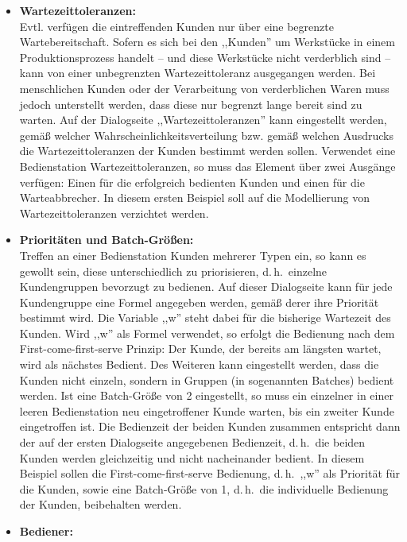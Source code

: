 \documentclass[deutsch]{svmono}
\begin{document}
\begin{itemize}
\item
\textbf{Wartezeittoleranzen:}\\
Evtl. verfügen die eintreffenden Kunden nur über eine begrenzte Wartebereitschaft. Sofern es sich bei den ,,Kunden'' um Werkstücke in einem Produktionsprozess handelt – und diese Werkstücke nicht verderblich sind – kann von einer unbegrenzten Wartezeittoleranz ausgegangen werden. Bei menschlichen Kunden oder der Verarbeitung von verderblichen Waren muss jedoch unterstellt werden, dass diese nur begrenzt lange bereit sind zu warten. Auf der Dialogseite ,,Wartezeittoleranzen'' kann eingestellt werden, gemäß welcher Wahrscheinlichkeitsverteilung bzw. gemäß welchen Ausdrucks die Wartezeittoleranzen der Kunden bestimmt werden sollen. Verwendet eine Bedienstation Wartezeittoleranzen, so muss das Element über zwei Ausgänge verfügen: Einen für die erfolgreich bedienten Kunden und einen für die Warteabbrecher. In diesem ersten Beispiel soll auf die Modellierung von Wartezeittoleranzen verzichtet werden.
\item
\textbf{Prioritäten und Batch-Größen:}\\
Treffen an einer Bedienstation Kunden mehrerer Typen ein, so kann es gewollt sein, diese unterschiedlich zu priorisieren, d.\,h.\ einzelne Kundengruppen bevorzugt zu bedienen. Auf dieser Dialogseite kann für jede Kundengruppe eine Formel angegeben werden, gemäß derer ihre Priorität bestimmt wird. Die Variable ,,w'' steht dabei für die bisherige Wartezeit des Kunden. Wird ,,w'' als Formel verwendet, so erfolgt die Bedienung nach dem First-come-first-serve Prinzip: Der Kunde, der bereits am längsten wartet, wird als nächstes Bedient.
Des Weiteren kann eingestellt werden, dass die Kunden nicht einzeln, sondern in Gruppen (in sogenannten Batches) bedient werden. Ist eine Batch-Größe von 2 eingestellt, so muss ein einzelner in einer leeren Bedienstation neu eingetroffener Kunde warten, bis ein zweiter Kunde eingetroffen ist. Die Bedienzeit der beiden Kunden zusammen entspricht dann der auf der ersten Dialogseite angegebenen Bedienzeit, d.\,h.\ die beiden Kunden werden gleichzeitig und nicht nacheinander bedient. In diesem Beispiel sollen die First-come-first-serve Bedienung, d.\,h.\ ,,w'' als Priorität für die Kunden, sowie eine Batch-Größe von 1, d.\,h.\ die individuelle Bedienung der Kunden, beibehalten werden.
\item
\textbf{Bediener:}\\

\end{itemize}
\end{document}

